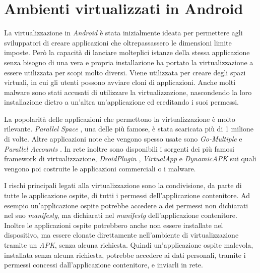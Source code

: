 
\chapter{Ambienti virtualizzati in Android}
\label{chap:virt_env}

La virtualizzazione in \emph{Android} è stata inizialmente ideata per permettere agli sviluppatori di creare applicazioni che oltrepassassero le dimensioni limite imposte. Però la capacità di lanciare molteplici istanze della stessa applicazione senza bisogno di una vera e propria installazione ha portato la virtualizzazione a essere utilizzata per scopi molto diversi. Viene utilizzata per creare degli spazi virtuali, in cui gli utenti possono avviare cloni di applicazioni. Anche molti malware sono stati accusati di utilizzare la virtualizzazione, nascondendo la loro installazione dietro a un'altra un'applicazione ed ereditando i suoi permessi.

La popolarità delle applicazioni che permettono la virtualizzazione è molto rilevante. \emph{Parallel Space} \cite{ParallelSpace}, una delle più famose, è stata scaricata più di 1 milione di volte. Altre applicazioni note che vengono spesso usate sono \emph{Go-Multiple} \cite{GoMultiple} e \emph{Parallel Accounts} \cite{parallelAccounts}. In rete inoltre sono disponibili i sorgenti dei più famosi framework di virtualizzazione, \emph{DroidPlugin} \cite{DroidPlugin}, \emph{VirtualApp} \cite{VirtualApp} e \emph{DynamicAPK} \cite{DynamicAPK} sui quali vengono poi costruite le applicazioni commerciali o i malware.

I rischi principali legati alla virtualizzazione sono la condivisione, da parte di tutte le applicazione ospite, di tutti i permessi dell'applicazione contenitore. Ad esempio un'applicazione ospite potrebbe accedere a dei permessi non dichiarati nel suo \emph{\gls{manifestg}}\glsfirstoccur, ma dichiarati nel \emph{\gls{manifestg}} dell'applicazione contenitore. Inoltre le applicazioni ospite potrebbero anche non essere installate nel dispositivo, ma essere clonate direttamente nell'ambiente di virtualizzazione tramite un \emph{APK}, senza alcuna richiesta. Quindi un'applicazione ospite malevola, installata senza alcuna richiesta, potrebbe accedere ai dati personali, tramite i permessi concessi dall'applicazione contenitore, e inviarli in rete. 

